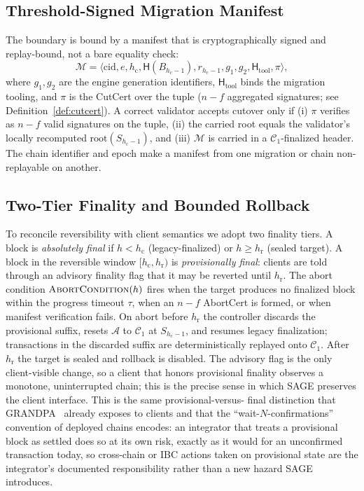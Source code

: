 \documentclass[journal]{IEEEtran}
\theoremstyle{remark}
\begin{document}
\subsection{Threshold-Signed Migration Manifest}
The boundary is bound by a manifest that is cryptographically signed and replay-bound, not a
bare equality check:
\begin{equation}
\mathcal{M} = \big\langle \mathrm{cid}, e, h_{\mathrm{c}}, \mathsf{H}(B_{h_{\mathrm{c}}-1}),
r_{h_{\mathrm{c}}-1}, g_1, g_2, \mathsf{H}_{\mathrm{tool}}, \pi \big\rangle,
\end{equation}
where $g_1,g_2$ are the engine generation identifiers, $\mathsf{H}_{\mathrm{tool}}$ binds the
migration tooling, and $\pi$ is the CutCert over the tuple ($n-f$ aggregated signatures; see
Definition~\ref{def:cutcert}). A
correct validator accepts cutover only if (i) $\pi$ verifies as $n-f$ valid signatures on the tuple,
(ii) the carried root equals the validator's locally recomputed
$\mathrm{root}(S_{h_{\mathrm{c}}-1})$, and (iii) $\mathcal{M}$ is carried in a
$\mathcal{C}_1$-finalized header. The chain identifier and epoch make a manifest from one
migration or chain non-replayable on another.

\subsection{Two-Tier Finality and Bounded Rollback}
To reconcile reversibility with client semantics we adopt two finality tiers. A block is
\emph{absolutely final} if $h < h_{\mathrm{c}}$ (legacy-finalized) or $h \ge h_{\mathrm{r}}$
(sealed target). A block in the reversible window $[h_{\mathrm{c}}, h_{\mathrm{r}})$ is
\emph{provisionally final}: clients are told through an advisory finality flag that it may be
reverted until $h_{\mathrm{r}}$. The abort condition $\textsc{AbortCondition}(h)$ fires when
the target produces no finalized block within the progress timeout $\tau$, when an $n-f$
AbortCert is formed, or when manifest verification fails. On abort before $h_{\mathrm{r}}$ the
controller discards the provisional suffix, resets $\mathcal{A}$ to $\mathcal{C}_1$ at
$S_{h_{\mathrm{c}}-1}$, and resumes legacy finalization; transactions in the discarded suffix
are deterministically replayed onto $\mathcal{C}_1$. After $h_{\mathrm{r}}$ the target is
sealed and rollback is disabled. The advisory flag is the only client-visible change, so a
client that honors provisional finality observes a monotone, uninterrupted chain; this is the
precise sense in which SAGE preserves the client interface. This is the same provisional-versus-
final distinction that GRANDPA~\cite{grandpa} already exposes to clients and that the
``wait-$N$-confirmations'' convention of deployed chains encodes: an integrator that treats a
provisional block as settled does so at its own risk, exactly as it would for an unconfirmed
transaction today, so cross-chain or IBC actions taken on provisional state are the integrator's
documented responsibility rather than a new hazard SAGE introduces.
\end{document}
